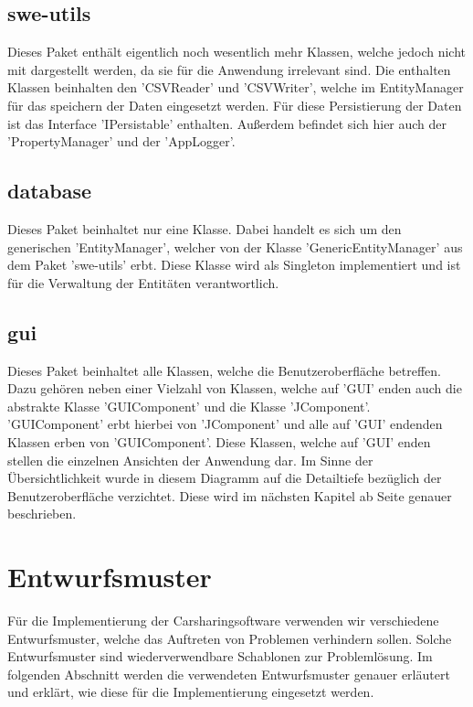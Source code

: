 \subsection{swe-utils}

Dieses Paket enthält eigentlich noch wesentlich mehr Klassen, welche jedoch nicht mit dargestellt werden, da sie für die Anwendung irrelevant sind. Die enthalten Klassen beinhalten den 'CSVReader' und 'CSVWriter', welche im EntityManager für das speichern der Daten eingesetzt werden. Für diese Persistierung der Daten ist das Interface 'IPersistable' enthalten. Außerdem befindet sich hier auch der 'PropertyManager' und der 'AppLogger'.

\subsection{database}
Dieses Paket beinhaltet nur eine Klasse. Dabei handelt es sich um den generischen 'EntityManager', welcher von der Klasse 'GenericEntityManager' aus dem Paket 'swe-utils' erbt. Diese Klasse wird als Singleton implementiert und ist für die Verwaltung der Entitäten verantwortlich.

\subsection{gui}
Dieses Paket beinhaltet alle Klassen, welche die Benutzeroberfläche betreffen. Dazu gehören neben einer Vielzahl von Klassen, welche auf 'GUI' enden auch die abstrakte Klasse 'GUIComponent' und die Klasse 'JComponent'. 'GUIComponent' erbt hierbei von 'JComponent' und alle auf 'GUI' endenden Klassen erben von 'GUIComponent'. Diese Klassen, welche auf 'GUI' enden stellen die einzelnen Ansichten der Anwendung dar. Im Sinne der Übersichtlichkeit wurde in diesem Diagramm auf die Detailtiefe bezüglich der Benutzeroberfläche verzichtet. Diese wird im nächsten Kapitel ab Seite \pageref{chapter:gui} genauer beschrieben.

\section{Entwurfsmuster}
Für die Implementierung der Carsharingsoftware verwenden wir verschiedene Entwurfsmuster, welche das Auftreten von Problemen verhindern sollen. Solche Entwurfsmuster sind wiederverwendbare Schablonen zur Problemlösung. Im folgenden Abschnitt werden die verwendeten Entwurfsmuster genauer erläutert und erklärt, wie diese für die Implementierung eingesetzt werden. 

